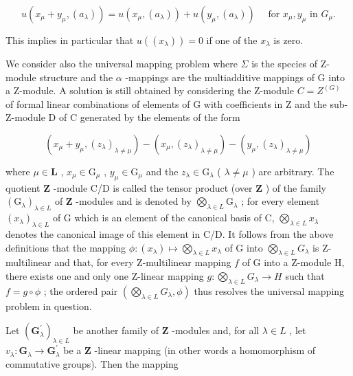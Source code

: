 \[
u (x _ {\mu} + y _ {\mu}, (a _ {\lambda})) = u (x _ {\mu}, (a _ {\lambda})) + u (y _ {\mu}, (a _ {\lambda})) \quad \text { for } x _ {\mu}, y _ {\mu} \text { in } G _ {\mu}.\tag{24}
\]

This implies in particular that \(u((x_{\lambda})) = 0\) if one of the \(x_{\lambda}\) is zero.

We consider also the universal mapping problem where \(\Sigma\) is the species of Z-module structure and the \(\alpha\) -mappings are the multiadditive mappings of G into a Z-module. A solution is still obtained by considering the Z-module \(C = Z^{(G)}\) of formal linear combinations of elements of G with coefficients in Z and the sub-Z-module D of C generated by the elements of the form

\[
\left(x _ {\mu} + y _ {\mu}, \left(z _ {\lambda}\right) _ {\lambda \neq \mu}\right) - \left(x _ {\mu}, \left(z _ {\lambda}\right) _ {\lambda \neq \mu}\right) - \left(y _ {\mu}, \left(z _ {\lambda}\right) _ {\lambda \neq \mu}\right)
\]

where \(\mu \in \mathbf{L}\) , \(x_{\mu} \in \mathrm{G}_{\mu}\) , \(y_{\mu} \in \mathrm{G}_{\mu}\) and the \(z_{\lambda} \in \mathrm{G}_{\lambda}\) ( \(\lambda \neq \mu\) ) are arbitrary. The quotient \(\mathbf{Z}\) -module C/D is called the tensor product (over \(\mathbf{Z}\) ) of the family \((\mathrm{G}_{\lambda})_{\lambda \in L}\) of \(\mathbf{Z}\) -modules and is denoted by \(\bigotimes_{\lambda \in L} \mathrm{G}_{\lambda}\) ; for every element \((x_{\lambda})_{\lambda \in L}\) of G which is an element of the canonical basis of C, \(\bigotimes_{\lambda \in L} x_{\lambda}\) denotes the canonical image of this element in C/D. It follows from the above definitions that the mapping \(\phi: (x_{\lambda}) \mapsto \bigotimes_{\lambda \in L} x_{\lambda}\) of G into \(\bigotimes_{\lambda \in L} G_{\lambda}\) is Z-multilinear and that, for every Z-multilinear mapping \(f\) of G into a Z-module H, there exists one and only one Z-linear mapping \(g: \bigotimes_{\lambda \in L} G_{\lambda} \to H\) such that \(f = g \circ \phi\) ; the ordered pair \(\left( \bigotimes_{\lambda \in L} G_{\lambda}, \phi \right)\) thus resolves the universal mapping problem in question.

Let \((\mathbf{G}_{\lambda}^{\prime})_{\lambda \in L}\) be another family of \(\mathbf{Z}\) -modules and, for all \(\lambda \in L\) , let \(v_{\lambda}: \mathbf{G}_{\lambda} \to \mathbf{G}_{\lambda}^{\prime}\) be a \(\mathbf{Z}\) -linear mapping (in other words a homomorphism of commutative groups). Then the mapping

